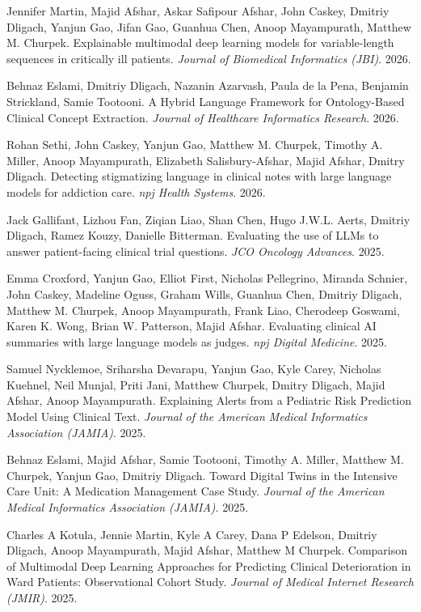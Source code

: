 \documentclass[letterpaper]{article}
\renewenvironment{itemize}{
  \begin{list}{}{
    \setlength{\leftmargin}{1.5em}
  }
}{
  \end{list}
}
\begin{document}
\begin{itemize}
\item Jennifer Martin, Majid Afshar, Askar Safipour Afshar, John Caskey, Dmitriy Dligach, Yanjun Gao, Jifan Gao, Guanhua Chen, Anoop Mayampurath, Matthew M. Churpek. Explainable multimodal deep learning models for variable-length sequences in critically ill patients. \emph{Journal of Biomedical Informatics (JBI)}. 2026.
\item Behnaz Eslami, Dmitriy Dligach, Nazanin Azarvash, Paula de la Pena, Benjamin Strickland, Samie Tootooni. A Hybrid Language Framework for Ontology-Based Clinical Concept Extraction. \emph{Journal of Healthcare Informatics Research}. 2026.
\item Rohan Sethi, John Caskey, Yanjun Gao, Matthew M. Churpek, Timothy A. Miller, Anoop Mayampurath, Elizabeth Salisbury-Afshar, Majid Afshar, Dmitry Dligach. Detecting stigmatizing language in clinical notes with large language models for addiction care. \emph{npj Health Systems}. 2026.
\item Jack Gallifant, Lizhou Fan, Ziqian Liao, Shan Chen, Hugo J.W.L. Aerts, Dmitriy Dligach, Ramez Kouzy, Danielle Bitterman. Evaluating the use of LLMs to answer patient-facing clinical trial questions. \emph{JCO Oncology Advances}. 2025. 
\item Emma Croxford, Yanjun Gao, Elliot First, Nicholas Pellegrino, Miranda Schnier, John Caskey, Madeline Oguss, Graham Wills, Guanhua Chen, Dmitriy Dligach, Matthew M. Churpek, Anoop Mayampurath, Frank Liao, Cherodeep Goswami, Karen K. Wong, Brian W. Patterson, Majid Afshar. Evaluating clinical AI summaries with
large language models as judges. \emph{npj Digital Medicine}. 2025.
\item Samuel Nycklemoe, Sriharsha Devarapu, Yanjun Gao, Kyle Carey, Nicholas Kuehnel, Neil Munjal, Priti Jani, Matthew Churpek, Dmitry Dligach, Majid Afshar, Anoop Mayampurath. Explaining Alerts from a Pediatric Risk Prediction Model Using Clinical Text. \emph{Journal of the American Medical Informatics Association (JAMIA)}. 2025.
\item Behnaz Eslami, Majid Afshar, Samie Tootooni, Timothy A. Miller, Matthew M. Churpek, Yanjun Gao, Dmitriy Dligach. Toward Digital Twins in the Intensive Care Unit: A Medication Management Case Study. \emph{Journal of the American Medical Informatics Association (JAMIA)}. 2025.
\item Charles A Kotula, Jennie Martin, Kyle A Carey, Dana P Edelson, Dmitriy Dligach, Anoop Mayampurath, Majid Afshar, Matthew M Churpek. Comparison of Multimodal Deep Learning Approaches for Predicting Clinical Deterioration in Ward Patients: Observational Cohort Study. \emph{Journal of Medical Internet Research (JMIR)}. 2025.

\end{itemize}
\end{document}
